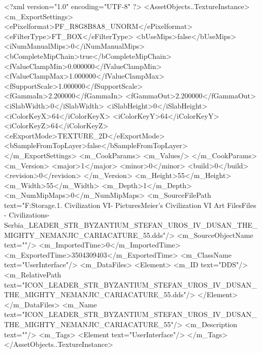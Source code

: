 <?xml version="1.0" encoding="UTF-8" ?>
<AssetObjects..TextureInstance>
	<m_ExportSettings>
		<ePixelformat>PF_R8G8B8A8_UNORM</ePixelformat>
		<eFilterType>FT_BOX</eFilterType>
		<bUseMips>false</bUseMips>
		<iNumManualMips>0</iNumManualMips>
		<bCompleteMipChain>true</bCompleteMipChain>
		<fValueClampMin>0.000000</fValueClampMin>
		<fValueClampMax>1.000000</fValueClampMax>
		<fSupportScale>1.000000</fSupportScale>
		<fGammaIn>2.200000</fGammaIn>
		<fGammaOut>2.200000</fGammaOut>
		<iSlabWidth>0</iSlabWidth>
		<iSlabHeight>0</iSlabHeight>
		<iColorKeyX>64</iColorKeyX>
		<iColorKeyY>64</iColorKeyY>
		<iColorKeyZ>64</iColorKeyZ>
		<eExportMode>TEXTURE_2D</eExportMode>
		<bSampleFromTopLayer>false</bSampleFromTopLayer>
	</m_ExportSettings>
	<m_CookParams>
		<m_Values/>
	</m_CookParams>
	<m_Version>
		<major>1</major>
		<minor>0</minor>
		<build>0</build>
		<revision>0</revision>
	</m_Version>
	<m_Height>55</m_Height>
	<m_Width>55</m_Width>
	<m_Depth>1</m_Depth>
	<m_NumMipMaps>0</m_NumMipMaps>
	<m_SourceFilePath text="F:\Mod Storage\2.1. Civilization VI\Mods\Archive - Pictures\Sid Meier's Civilization VI Art Files\Art Files - Civilizations\Civilization - Serbia\ICON_LEADER_STR_BYZANTIUM_STEFAN_UROS_IV_DUSAN_THE_MIGHTY_NEMANJIC_CARIACATURE_55.dds"/>
	<m_SourceObjectName text=""/>
	<m_ImportedTime>0</m_ImportedTime>
	<m_ExportedTime>3504309403</m_ExportedTime>
	<m_ClassName text="UserInterface"/>
	<m_DataFiles>
		<Element>
			<m_ID text="DDS"/>
			<m_RelativePath text="ICON_LEADER_STR_BYZANTIUM_STEFAN_UROS_IV_DUSAN_THE_MIGHTY_NEMANJIC_CARIACATURE_55.dds"/>
		</Element>
	</m_DataFiles>
	<m_Name text="ICON_LEADER_STR_BYZANTIUM_STEFAN_UROS_IV_DUSAN_THE_MIGHTY_NEMANJIC_CARIACATURE_55"/>
	<m_Description text=""/>
	<m_Tags>
		<Element text="UserInterface"/>
	</m_Tags>
</AssetObjects..TextureInstance>


